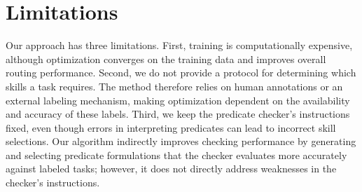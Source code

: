 
\section*{Limitations}

Our approach has three limitations. First, training is computationally expensive, although optimization converges on the training data and improves overall routing performance. Second, we do not provide a protocol for determining which skills a task requires. The method therefore relies on human annotations or an external labeling mechanism, making optimization dependent on the availability and accuracy of these labels. Third, we keep the predicate checker's instructions fixed, even though errors in interpreting predicates can lead to incorrect skill selections. Our algorithm indirectly improves checking performance by generating and selecting predicate formulations that the checker evaluates more accurately against labeled tasks; however, it does not directly address weaknesses in the checker's instructions.

